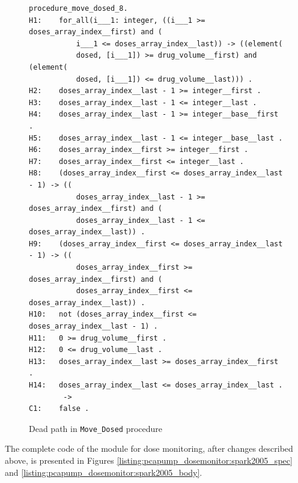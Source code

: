 \begin{figure}
\singlespacing
\begin{lstlisting}[frame=single, gobble=0]
procedure_move_dosed_8.
H1:    for_all(i___1: integer, ((i___1 >= doses_array_index__first) and (
           i___1 <= doses_array_index__last)) -> ((element(
           dosed, [i___1]) >= drug_volume__first) and (element(
           dosed, [i___1]) <= drug_volume__last))) .
H2:    doses_array_index__last - 1 >= integer__first .
H3:    doses_array_index__last - 1 <= integer__last .
H4:    doses_array_index__last - 1 >= integer__base__first .
H5:    doses_array_index__last - 1 <= integer__base__last .
H6:    doses_array_index__first >= integer__first .
H7:    doses_array_index__first <= integer__last .
H8:    (doses_array_index__first <= doses_array_index__last - 1) -> ((
           doses_array_index__last - 1 >= doses_array_index__first) and (
           doses_array_index__last - 1 <= doses_array_index__last)) .
H9:    (doses_array_index__first <= doses_array_index__last - 1) -> ((
           doses_array_index__first >= doses_array_index__first) and (
           doses_array_index__first <= doses_array_index__last)) .
H10:   not (doses_array_index__first <= doses_array_index__last - 1) .
H11:   0 >= drug_volume__first .
H12:   0 <= drug_volume__last .
H13:   doses_array_index__last >= doses_array_index__first .
H14:   doses_array_index__last <= doses_array_index__last .
        ->
C1:    false .
\end{lstlisting}
\doublespacing
\caption{Dead path in \lstinline{Move_Dosed} procedure}
\label{listing:pcapump_dosemonitor:dead_path}
\end{figure}

The complete code of the module for dose monitoring, after changes described above, is presented in Figures \ref{listing:pcapump_dosemonitor:spark2005_spec} and \ref{listing:pcapump_dosemonitor:spark2005_body}.

